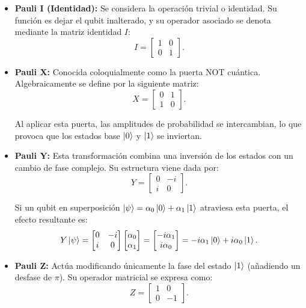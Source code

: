 \begin{itemize}
    \item \textbf{Pauli I (Identidad):} Se considera la operación trivial o identidad. Su función es dejar el qubit inalterado, y su operador asociado se denota mediante la matriz identidad $I$:
          \[
              I = \begin{bmatrix}
                  1 & 0 \\
                  0 & 1
              \end{bmatrix}.
          \]

    \item \textbf{Pauli X:} Conocida coloquialmente como la puerta NOT cuántica. Algebraicamente se define por la siguiente matriz:
          \[
              X = \begin{bmatrix}
                  0 & 1 \\
                  1 & 0
              \end{bmatrix}.
          \]

          Al aplicar esta puerta, las amplitudes de probabilidad se intercambian, lo que provoca que los estados base $\ket{0}$ y $\ket{1}$ se inviertan.

    \item \textbf{Pauli Y:} Esta transformación combina una inversión de los estados con un cambio de fase complejo. Su estructura viene dada por:
          \[
              Y = \begin{bmatrix}
                  0 & -i \\
                  i & 0
              \end{bmatrix}.
          \]

          Si un qubit en superposición $\ket{\psi} = \alpha_0\ket{0} + \alpha_1\ket{1}$ atraviesa esta puerta, el efecto resultante es:
          \[
              Y\ket{\psi} = \begin{bmatrix} 0 & -i \\ i & 0 \end{bmatrix} \begin{bmatrix} \alpha_0 \\ \alpha_1 \end{bmatrix} = \begin{bmatrix} -i\alpha_1 \\ i\alpha_0 \end{bmatrix} = -i\alpha_1\ket{0} + i\alpha_0\ket{1}.
          \]

    \item \textbf{Pauli Z:} Actúa modificando únicamente la fase del estado $\ket{1}$ (añadiendo un desfase de $\pi$). Su operador matricial se expresa como:
          \[
              Z = \begin{bmatrix}
                  1 & 0  \\
                  0 & -1
              \end{bmatrix}.
          \]


\end{itemize}
